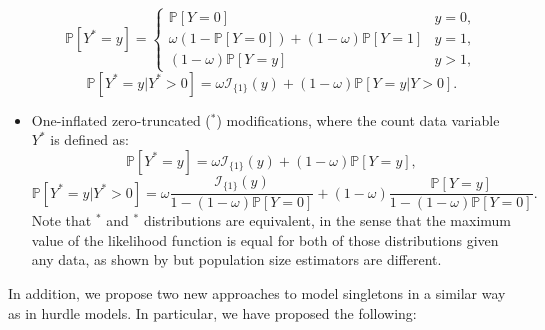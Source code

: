 \documentclass[
]{jss}
\newcommand{\1}{\mathcal{I}} \newcommand{\bZero}{\boldsymbol{0}}
\begin{document}
\begin{itemize}
    \begin{equation*}
    \mathbb{P}\left[Y^{\ast}=y\right]=
    \begin{cases}
    \mathbb{P}[Y=0] & y=0, \\
    \omega\left(1-\mathbb{P}[Y=0]\right)+(1-\omega)\mathbb{P}[Y=1] & y=1, \\
    (1-\omega)\mathbb{P}[Y=y] & y>1,
    \end{cases}
    \end{equation*}
    \begin{equation*}
        \mathbb{P}\left[Y^{\ast}=y|Y^{\ast}>0\right]=\omega\mathcal{I}_{\{1\}}(y)+(1-\omega)\mathbb{P}[Y=y|Y>0].
    \end{equation*}
    \item One-inflated zero-truncated ($^\ast$) modifications, where the count data variable $Y^{\ast}$ is defined as:
    \begin{equation*}
        \mathbb{P}\left[Y^{\ast}=y\right] = \omega \mathcal{I}_{\{1\}}(y)+(1-\omega)\mathbb{P}[Y=y],
    \end{equation*}
    \begin{equation*}
        \mathbb{P}\left[Y^{\ast}=y|Y^{\ast}>0\right] = 
        \omega\frac{\mathcal{I}_{\{1\}}(y)}{1-(1-\omega)\mathbb{P}[Y=0]}+
        (1-\omega)\frac{\mathbb{P}[Y=y]}{1-(1-\omega)\mathbb{P}[Y=0]}.
    \end{equation*}
    Note that $^\ast$ and $^\ast$ distributions are equivalent, in the sense that the maximum value of the likelihood function is equal for both of those distributions given any data, as shown by \cite{bohning2023equivalence} but population size estimators are different.
\end{itemize}

In addition, we propose two new approaches to model singletons in a
similar way as in hurdle models. In particular, we have proposed the
following:
\end{document}
